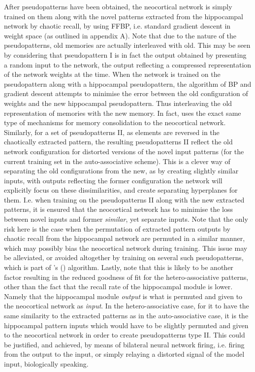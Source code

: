 After pseudopatterns have been obtained, the neocortical network is simply trained on them along with the novel patterns extracted from the hippocampal network by chaotic recall, by using FFBP, i.e. standard gradient descent in weight space (as outlined in appendix A). Note that due to the nature of the pseudopatterns, old memories are actually interleaved with old. This may be seen by considering that pseudopattern I is in fact the output obtained by presenting a random input to the network, the output reflecting a compressed representation of the network weights at the time. When the network is trained on the pseudopattern along with a hippocampal pseudopattern, the algorithm of BP and gradient descent attempts to minimise the error between the old configuration of weights and the new hippocampal pseudopattern. Thus interleaving the old representation of memories with the new memory. In fact, \cite{Hattori2014} uses the exact same type of mechanisms for memory consolidation to the neocortical network.
Similarly, for a set of pseudopatterns II, as elements are reversed in the chaotically extracted pattern, the resulting pseudopatterns II reflect the old network configuration for distorted versions of the novel input patterns (for the current training set in the auto-associative scheme). This is a clever way of separating the old configurations from the new, as by creating slightly similar inputs, with outputs reflecting the former configuration the network will explicitly focus on these dissimilarities, and create separating hyperplanes for them. I.e. when training on the pseudopatterns II along with the new extracted patterns, it is ensured that the neocortical network has to minimise the loss between novel inputs and former \textit{similar}, yet separate inputs. Note that the only risk here is the case when the permutation of extracted pattern outputs by chaotic recall from the hippocampal network are permuted in a similar manner, which may possibly bias the neocortical network during training. This issue may be alleviated, or avoided altogether by training on several such pseudopatterns, which is part of \citeauthor{Hattori2014}'s (\citeyear{Hattori2014}) algorithm. Lastly, note that this is likely to be another factor resulting in the reduced goodness of fit for the hetero-associative patterns, other than the fact that the recall rate of the hippocampal module is lower. Namely that the hippocampal module \textit{output} is what is permuted and given to the neocortical network as \textit{input}. In the hetero-associative case, for it to have the same similarity to the extracted patterns as in the auto-associative case, it is the hippocampal pattern inputs which would have to be slightly permuted and given to the neocortical network in order to create pseudopatterns type II. This could be justified, and achieved, by means of bilateral neural network firing, i.e. firing from the output to the input, or simply relaying a distorted signal of the model input, biologically speaking.

